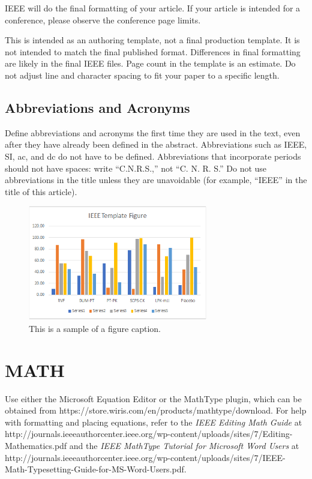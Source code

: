 \documentclass{IEEEtaes}
\begin{document}
IEEE will do the final formatting of your article. If your article is intended for a conference, please observe the conference page limits.

This is intended as an authoring template, not a final production template. It is not intended to match the final published format. Differences in final formatting are likely in the final IEEE files. Page count in the template is an estimate. Do not adjust line and character spacing to fit your paper to a specific length.

\subsection{Abbreviations and Acronyms}

Define abbreviations and acronyms the first time they are used in the text, even after they have already been defined in the abstract. Abbreviations such as IEEE, SI, ac, and dc do not have to be defined. Abbreviations that incorporate periods should not have spaces: write ``C.N.R.S.,'' not ``C. N. R. S.'' Do not use abbreviations in the title unless they are unavoidable (for example, ``IEEE'' in the title of this article).

\begin{figure}
\centerline{\includegraphics[width=18.5pc]{fig1.png}}
\caption{This is a sample of a figure caption.}
\end{figure}

\section{MATH}

Use either the Microsoft Equation Editor or the MathType plugin, which can be obtained from {https://store.wiris.com/en/products/mathtype/download}. For help with formatting and placing equations, refer to the {\it IEEE Editing Math Guide} at {http://journals.ieeeauthorcenter.ieee.org/wp-content/\break uploads/sites/7/Editing-Mathematics.pdf} and the {\it IEEE MathType Tutorial for Microsoft Word Users} at {http://journals.ieeeauthorcenter.ieee.org/wp-content/uploads/sites/7/IEEE-Math-Typesetting-Guide-for-MS-Word-Users.pdf}.
\end{document}

